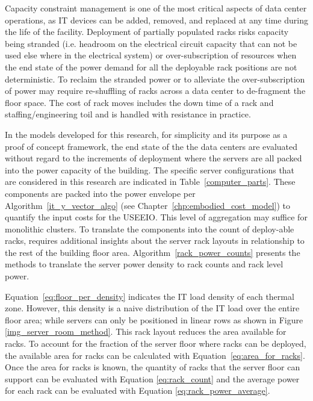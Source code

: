     Capacity constraint management is one of the most critical aspects of data center operations, as IT devices can be added, removed, and replaced at any time during the life of the facility. Deployment of partially populated racks risks capacity being stranded (i.e. headroom on the electrical circuit capacity that can not be used else where in the electrical system) or over-subscription of resources when the end state of the power demand for all the deployable rack positions are not deterministic. To reclaim the stranded power or to alleviate the over-subscription of power may require re-shuffling of racks across a data center to de-fragment the floor space. The cost of rack moves includes the down time of a rack and staffing/engineering toil and is handled with resistance in practice.
    
    In the models developed for this research, for simplicity and its purpose as a proof of concept framework, the end state of the the data centers are evaluated without regard to the increments of deployment where the servers are all packed into the power capacity of the building. The specific server configurations that are considered in this research are indicated in Table~\ref{computer_parts}. These components are packed into the power envelope per Algorithm~\ref{it_y_vector_algo} (see Chapter~\ref{chp:embodied_cost_model}) to quantify the input costs for the USEEIO. This level of aggregation may suffice for monolithic clusters. To translate the components into the count of deploy-able racks, requires additional insights about the server rack layouts in relationship to the rest of the building floor area. Algorithm~\ref{rack_power_counts} presents the methods to translate the server power density to rack counts and rack level power. 
    
    
    
    
    Equation~\ref{eq:floor_per_density} indicates the IT load density of each thermal zone. However, this density is a naive distribution of the IT load over the entire floor area; while servers can only be positioned in linear rows as shown in Figure \ref{img_server_room_method}. This rack layout reduces the area available for racks. To account for the fraction of the server floor where racks can be deployed, the available area for racks can be calculated with Equation~\ref{eq:area_for_racks}. Once the area for racks is known, the quantity of racks that the server floor can support can be evaluated with Equation \ref{eq:rack_count} and the average power for each rack can be evaluated with Equation \ref{eq:rack_power_average}.
    
